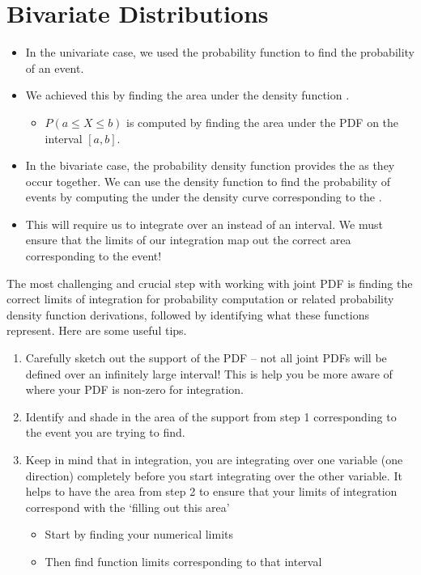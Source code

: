 \section{Bivariate Distributions}

\begin{itemize}
    \item In the univariate case, we used the probability  function to find the probability  of an event.
    \item We achieved this by finding the area under the density function .
    \begin{itemize}
        \item $P(a \le X \le b)$ is computed by finding the area under the PDF on the interval $[a, b]$. 
    \end{itemize}
    \item In the bivariate case, the probability density function provides the  as they occur together. We can use the density function to find the probability  of events by computing the  under the density curve corresponding to the .
    \item This will require us to integrate over an  instead of an interval. We must ensure that the limits of our integration map out the correct area corresponding to the event!
\end{itemize}

The most challenging and crucial step with working with joint PDF is finding the correct limits of integration for probability computation or related probability density function derivations, followed by identifying what these functions represent. Here are some useful tips. 

\begin{enumerate}
    \item Carefully sketch out the support of the PDF -- not all joint PDFs will be defined over an infinitely large interval! This is help you be more aware of where your PDF is non-zero for integration.
    \item Identify and shade in the area of the support from step 1 corresponding to the event you are trying to find. 
    \item Keep in mind that in integration, you are integrating over one variable (one direction) completely before you start integrating over the other variable. It helps to have the area from step 2 to ensure that your limits of integration correspond with the `filling out this area' 
    \begin{itemize}
        \item Start by finding your numerical limits 
        \item Then find function limits corresponding to that interval 
    \end{itemize}
\end{enumerate}

